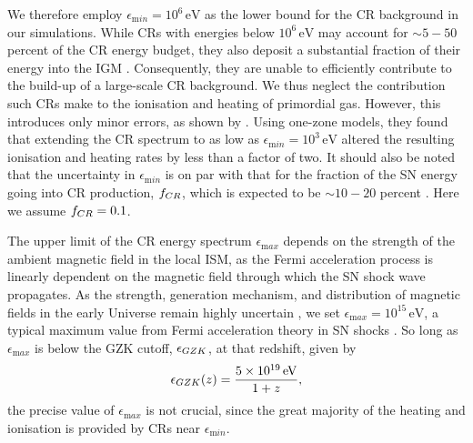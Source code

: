 \documentclass{thesis}
\newcommand{\ev}{\ensuremath{\,\mathrm{eV}}\xspace}
\begin{document}
We therefore employ $\epsilon_{\mathrm min} = 10^6\ev$ as the lower bound for the CR background in our simulations.  
While CRs with energies below $10^6\ev$ may account for $\sim$$5-50$ percent of the CR energy budget, they also deposit a substantial fraction of their energy into the IGM \citep{SazonovSunyaev2015}. 
Consequently, they are unable to efficiently contribute to the build-up of a large-scale CR background. We thus neglect the contribution such CRs make to the ionisation and heating of primordial gas. 
However, this introduces only minor errors, as shown by \citet{StacyBromm2007}. Using one-zone models, they found that extending the CR spectrum to as low as $\epsilon_{\mathrm min} = 10^3\ev$ altered the resulting ionisation and heating rates by less than a factor of two.  
It should also be noted that the uncertainty in $\epsilon_{\mathrm min}$ is on par with that for the fraction of the SN energy going into CR production, $f_{\mathrm \small CR}$, which is expected to be $\sim$$10-20$ percent \citep{CaprioliSpitkovsky2014}.  
Here we assume $f_{\mathrm \small CR} = 0.1$.

The upper limit of the CR energy spectrum $\epsilon_{\mathrm max}$ depends on the strength of the ambient magnetic field in the local ISM, as the Fermi acceleration process is linearly dependent on the magnetic field through which the SN shock wave propagates. 
As the strength, generation mechanism, and distribution of magnetic fields in the early Universe remain highly uncertain \citep{DurrerNeronov2013}, we set $\epsilon_{\mathrm max} = 10^{15}\ev$, a typical maximum value from Fermi acceleration theory in SN shocks \citep[e.g.,][]{BlandfordEichler1987}.  
So long as $\epsilon_{\mathrm max}$ is below the GZK cutoff, $\epsilon_{\mathrm \small GZK}$, at that redshift, given by \citep{StacyBromm2007}
\begin{equation}
\epsilon_{\mathrm \small GZK}(z) = \frac{5\times10^{19}\ev}{1+z},
\end{equation}
the precise value of $\epsilon_{\mathrm max}$ is not crucial, since the great majority of the heating and ionisation is provided by CRs near $\epsilon_{\mathrm min}$.
\end{document}
